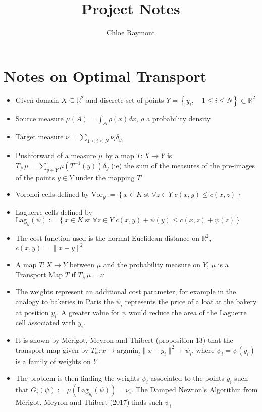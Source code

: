 \documentclass[]{article}
\title{Project Notes}
\author{Chloe Raymont}
\begin{document}
\maketitle

\begin{abstract}

\end{abstract}

\section{Notes on Optimal Transport}
	\begin{itemize}
		\item Given domain $X \subseteq \mathbb{R}^2$ and discrete set of points $Y = \left\lbrace y_i, \quad 1\leq i \leq N \right\rbrace  \subset \mathbb{R}^2$ 
		\item Source measure $\mu(A) = \int_A \rho(x)dx$, $\rho$ a probability density
		\item Target measure $\nu = \sum_{1\leq i \leq N}\nu_i \delta_{y_i}$ 
		\item Pushforward of a measure $\mu$ by a map $T: X \rightarrow Y$ is $T_{\#}\mu = \sum_{y \in Y} \mu \left( T^{-1}(y) \right) \delta_{y}$ (ie) the sum of the measures of the pre-images of the points $y \in Y$ under the mapping $T$
		\item Voronoi cells defined by $\text{Vor}_y := \left\lbrace x \in K \; \text{st} \; \forall z \in Y \; c(x,y) \leq c(x,z) \right\rbrace$
		\item Laguerre cells defined by $\text{Lag}_y(\psi) := \left\lbrace x \in K \; \text{st} \; \forall z \in Y \; c(x,y) + \psi(y) \leq c(x,z) + \psi(z) \right\rbrace$
		\item The cost function used is the normal Euclidean distance on $\mathbb{R}^2$, $c(x,y) = \| x-y\|^2$
		\item A map $T: X \rightarrow Y$ between $\mu$ and the probability measure on $Y$, $\mu$ is a Transport Map $T$ if $T_{\#}\mu = \nu$
		\item The weights represent an additional cost parameter, for example in the analogy to bakeries in Paris the $\psi_i$ represents the price of a loaf at the bakery at position $y_i$. A greater value for $\psi$ would reduce the area of the Laguerre cell associated with $y_i$.
		\item It is shown by M\'{e}rigot, Meyron and Thibert \cite{Merigot2017} (proposition 13) that the transport map given by $T_\psi: x \rightarrow \text{argmin}_i\| x - y_i \|^2 + \psi_i$, where $\psi_i = \psi(y_i)$ is a family of weights on $Y$
		
		\item The problem is then finding the weights $\psi_i$ associated to the points $y_i$ such that $G_i(\psi) := \mu (\text{Lag}_{y_i}(\psi)) = \nu_i$. The Damped Newton's Algorithm from M\'{e}rigot, Meyron and Thibert (2017) finds such $\psi_i$
		
	\end{itemize}
\end{document}
